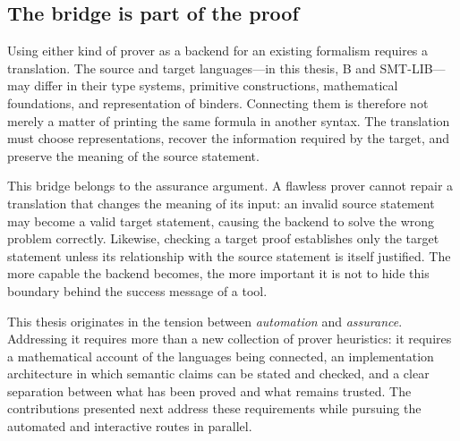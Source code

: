 \subsection{The bridge is part of the proof}
\label{subsec:intro-bridge-trust}

Using either kind of prover as a backend for an existing formalism requires a
translation. The source and target languages---in this thesis, B and SMT-LIB---may differ
in their type systems, primitive constructions, mathematical foundations, and
representation of binders. Connecting them is therefore not merely a matter of
printing the same formula in another syntax. The translation must choose
representations, recover the information required by the target, and preserve
the meaning of the source statement.

This bridge belongs to the assurance argument. A flawless prover cannot repair
a translation that changes the meaning of its input: an invalid source
statement may become a valid target statement, causing the backend to solve the
wrong problem correctly. Likewise, checking a target proof establishes only the
target statement unless its relationship with the source statement is itself
justified. The more capable the backend becomes, the more important it is not to
hide this boundary behind the success message of a tool.

This thesis originates in the tension between \emph{automation} and
\emph{assurance}.
Addressing it requires more than a new collection of prover heuristics: it
requires a mathematical account of the languages being connected, an
implementation architecture in which semantic claims can be stated and checked,
and a clear separation between what has been proved and what remains trusted.
The contributions presented next address these requirements while pursuing the
automated and interactive routes in parallel.

